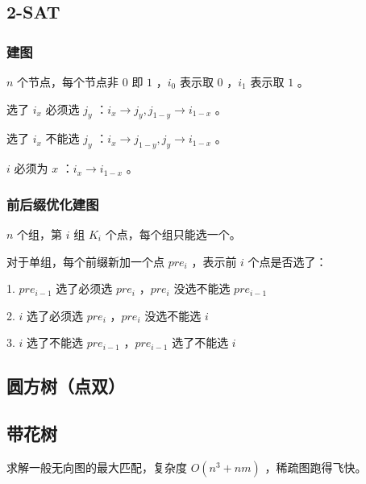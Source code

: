 \subsection{2-SAT}

\subsubsection{建图}

$n$ 个节点，每个节点非 $0$ 即 $1$ ，$i_0$ 表示取 $0$ ，$i_1$ 表示取 $1$ 。

选了 $i_x$ 必须选 $j_y$ ：$i_x\to j_y,j_{1-y}\to i_{1-x}$ 。

选了 $i_x$ 不能选 $j_y$ ：$i_x\to j_{1-y},j_{y}\to i_{1-x}$ 。

$i$ 必须为 $x$ ：$i_x\to i_{1-x}$ 。



\vspace{-0.4cm}

\subsubsection{前后缀优化建图}

\vspace{-0.2cm}

$n$ 个组，第 $i$ 组 $K_i$ 个点，每个组只能选一个。

对于单组，每个前缀新加一个点 $pre_i$ ，表示前 $i$ 个点是否选了：

1. $pre_{i-1}$ 选了必须选 $pre_{i}$ ，$pre_i$ 没选不能选 $pre_{i-1}$

2. $i$ 选了必须选 $pre_i$ ，$pre_i$ 没选不能选 $i$

3. $i$ 选了不能选 $pre_{i-1}$ ，$pre_{i-1}$ 选了不能选 $i$

\newpage

\subsection{圆方树（点双）}



\vspace{-0.6cm}

\subsection{带花树}

求解一般无向图的最大匹配，复杂度 $O(n^3+nm)$ ，稀疏图跑得飞快。

